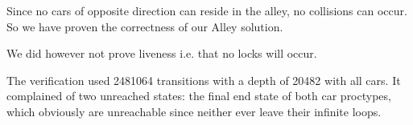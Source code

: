Since no cars of opposite direction can reside in the alley, no collisions can occur. So we have proven the correctness of our Alley solution.

We did however not prove liveness i.e. that no locks will occur.

The verification used 2481064 transitions with a depth of 20482 with all cars. It complained of two unreached states: the final end state of both car proctypes, which obviously are unreachable since neither ever leave their infinite loops.
